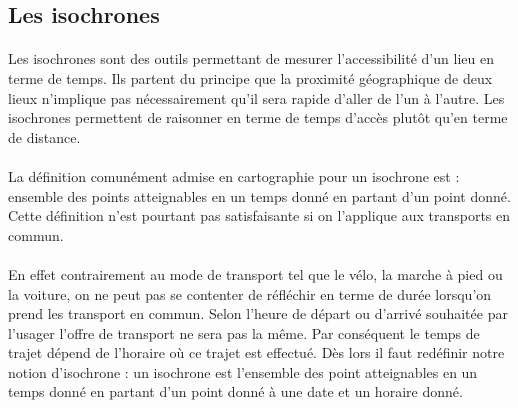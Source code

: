 \documentclass[a4paper]{report}
\begin{document}
\subsection{Les isochrones}

\paragraph{}Les isochrones sont des outils permettant de mesurer l'accessibilité d'un lieu en terme de temps. Ils partent du principe que la proximité géographique de deux lieux n'implique pas nécessairement qu'il sera rapide d'aller de l'un à l'autre. Les isochrones permettent de raisonner en terme de temps d'accès plutôt qu'en terme de distance.

\paragraph{}La définition comunément admise en cartographie pour un isochrone est : ensemble des points atteignables en un temps donné en partant d'un point donné. Cette définition n'est pourtant pas satisfaisante si on l'applique aux transports en commun. 

\paragraph{}En effet contrairement au mode de transport tel que le vélo, la marche à pied ou la voiture, on ne peut pas se contenter de réfléchir en terme de durée lorsqu'on prend les transport en commun. Selon l'heure de départ ou d'arrivé souhaitée par l'usager l'offre de transport ne sera pas la même. Par conséquent le temps de trajet dépend de l'horaire où ce trajet est effectué. Dès lors il faut redéfinir notre notion d'isochrone : un isochrone est l'ensemble des point atteignables en un temps donné en partant d'un point donné à une date et un horaire donné.
\end{document}
